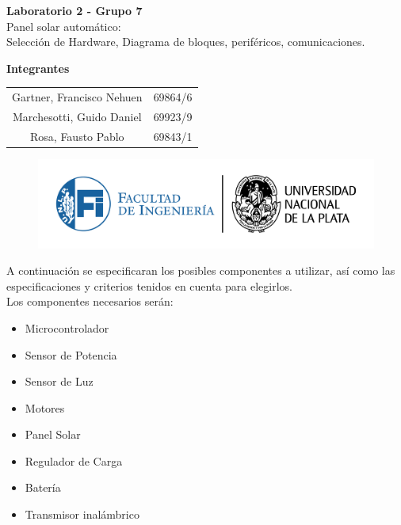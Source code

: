 \documentclass[a4paper,12pt]{article}
\begin{document}
\begin{titlepage}
    \begin{center}
        \vspace*{3cm}
        
        {\Huge \textbf{Laboratorio 2 - Grupo 7}}\\[1cm]
        {\LARGE Panel solar automático:\\ [0.5cm]  Selección de Hardware, Diagrama de bloques, periféricos, comunicaciones.}\\[2cm]
        
        \vfill
        
        {\Large \textbf{Integrantes }}\\[.5cm]
        \large
        \begin{tabular}{c c}
            Gartner, Francisco Nehuen & 69864/6 \\
            Marchesotti, Guido Daniel & 69923/9 \\
            Rosa, Fausto Pablo & 69843/1 \\
        \end{tabular}
        
        \vspace{1cm}
        
        \begin{figure}[b]
            \centering
            \includegraphics[width=1\linewidth]{LOGOSFI-UNLP-color-01.png}
        \end{figure}
        
    \end{center}
\end{titlepage}


A continuación se especificaran los posibles componentes a utilizar, así como las especificaciones y criterios tenidos en cuenta para elegirlos. \\
Los componentes necesarios serán: 
\begin{itemize}
\item Microcontrolador
\item Sensor de Potencia
\item Sensor de Luz
\item Motores
\item Panel Solar
\item Regulador de Carga
\item Batería
\item Transmisor inalámbrico
\end{itemize}
\end{document}
